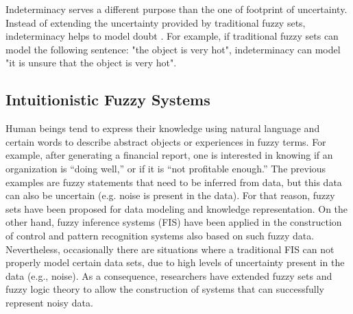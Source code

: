 Indeterminacy serves a different purpose than the one of footprint of
uncertainty. Instead of extending the uncertainty provided by traditional fuzzy
sets, indeterminacy helps to model doubt \cite{Xu2007}. For example, if
traditional fuzzy sets can model the following sentence: "the object is very
hot", indeterminacy can model "it is unsure that the object is very hot".

\subsection{Intuitionistic Fuzzy Systems}
\label{subsection:intuitionistic-fuzzy-systems}

Human beings tend to express their knowledge using natural language and certain
words to describe abstract objects or experiences in fuzzy terms. For example,
after generating a financial report, one is interested in knowing if an
organization is ``doing well,'' or if it is ``not profitable enough.'' The
previous examples are fuzzy statements that need to be inferred from data, but
this data can also be uncertain (e.g. noise is present in the data). For that
reason, fuzzy sets have been proposed for data modeling and knowledge
representation. On the other hand, fuzzy inference systems (FIS) have been
applied in the construction of control and pattern recognition systems also
based on such fuzzy data. Nevertheless, occasionally there are situations where
a traditional FIS can not properly model certain data sets, due to high levels
of uncertainty present in the data (e.g., noise). As a consequence, researchers
have extended fuzzy sets and fuzzy logic theory to allow the construction of
systems that can successfully represent noisy data.

